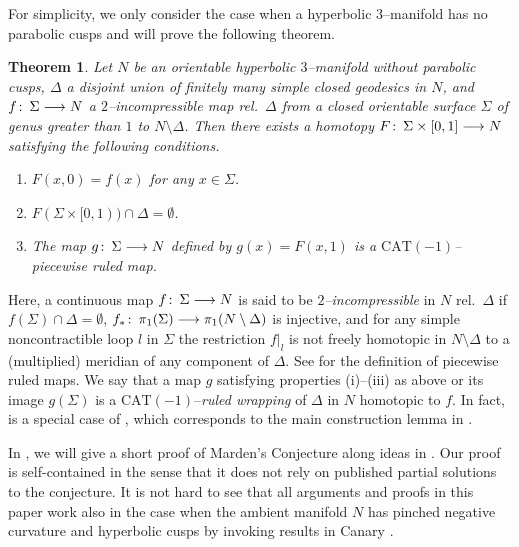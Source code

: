 \documentclass{gtart_a}
\def\S{Section }
\newtheorem{theorem}{Theorem}[section]
\theoremstyle{definition}
\numberwithin{equation}{section}
\begin{document}
For simplicity, we only consider the case when a hyperbolic $3$--manifold has no parabolic cusps and will prove the 
following theorem.




\begin{theorem}\label{t_1}
Let $N$ be an orientable hyperbolic $3$--manifold without parabolic cusps, $\Delta$ a disjoint union of finitely 
many simple closed geodesics in $N$, and $f\mskip0.5mu\colon\thinspace \Sigma\longrightarrow N$ a $2$--incompressible map rel.\ $\Delta$ from 
a closed orientable surface $\Sigma$ of genus greater than $1$ to $N\setminus \Delta$.
Then there exists a homotopy $F\mskip0.5mu\colon\thinspace \Sigma\times [0,1]\longrightarrow N$ satisfying the following conditions.
\begin{enumerate}[\rm (i)]
\item
$F(x,0)=f(x)$ for any $x\in \Sigma$.
\item
$F(\Sigma\times [0,1))\cap \Delta=\emptyset$.
\item
The map $g\mskip0.5mu\colon\thinspace \Sigma\longrightarrow N$ defined by $g(x)=F(x,1)$ is a $\mathrm{CAT}(-1)$--piecewise ruled map.
\end{enumerate}
\end{theorem}



Here, a continuous map $f\mskip0.5mu\colon\thinspace \Sigma\longrightarrow N$ is said to be \emph{$2$--incompressible\/} in $N$ rel.\ $\Delta$ if 
$f(\Sigma)\cap \Delta=\emptyset$, $f_*\mskip0.5mu\colon\thinspace \pi_1(\Sigma)\longrightarrow \pi_1(N\setminus \Delta)$ is injective, and 
for any simple noncontractible loop $l$ in $\Sigma$ the restriction $f|_l$ is not freely homotopic in $N\setminus 
\Delta$ to a (multiplied) meridian of any component of $\Delta$.
See  for the definition of piecewise ruled maps.
We say that a map $g$ satisfying properties (i)--(iii) as above or its image $g(\Sigma)$ is a 
$\mathrm{CAT}(-1)$--\emph{ruled wrapping\/} of $\Delta$ in $N$ homotopic to $f$.
In fact,  is a special case of , which corresponds to the main construction 
lemma in \cite{cg}.


In , we will give a short proof of Marden's Conjecture along ideas in \cite{cg}.
Our proof is self-contained in the sense that it does not rely on published partial solutions to the conjecture.
It is not hard to see that all arguments and proofs in this paper work also in the case when the ambient manifold 
$N$ has pinched negative curvature and hyperbolic cusps by invoking results in Canary \cite[\S 4]{can}.

\medskip
\end{document}

